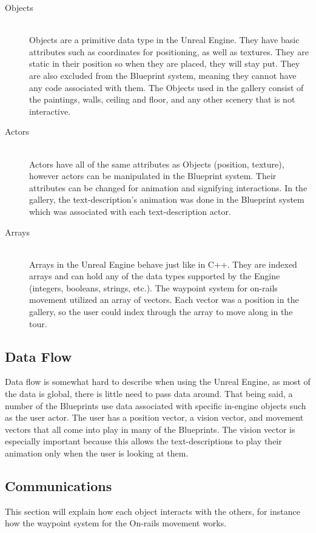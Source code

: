  \begin{description}
 \item[Objects] \hfill \\
 Objects are a primitive data type in the Unreal Engine.  They have basic attributes such as coordinates for positioning, as well as textures.  They are static in their position so when they are placed, they will stay put.  They are also excluded from the Blueprint system, meaning they cannot have any code associated with them.  The Objects used in the gallery consist of the paintings, walls, ceiling and floor, and any other scenery that is not interactive.
 
 \item[Actors] \hfill \\
 Actors have all of the same attributes as Objects (position, texture), however actors can be manipulated in the Blueprint system.  Their attributes can be changed for animation and signifying interactions.  In the gallery, the text-description's animation was done in the Blueprint system which was associated with each text-description actor.
 
 \item[Arrays] \hfill \\
 Arrays in the Unreal Engine behave just like in C++. They are indexed arrays and can hold any of the data types supported by the Engine (integers, booleans, strings, etc.).  The waypoint system for on-rails movement utilized an array of vectors.  Each vector was a position in the gallery, so the user could index through the array to move along in the tour.
 \end{description}
  
 \subsection{Data Flow}
  Data flow is somewhat hard to describe when using the Unreal Engine, as most of the data is global, there is little need to pass data around.  That being said, a number of the Blueprints use data associated with specific in-engine objects such as the user actor.  The user has a position vector, a vision vector, and movement vectors that all come into play in many of the Blueprints.  The vision vector is especially important because this allows the text-descriptions to play their animation only when the user is looking at them.  
 
 \subsection{Communications}
 This section will explain how each object interacts with the others, for instance how the waypoint system for the On-rails movement works. 
 
